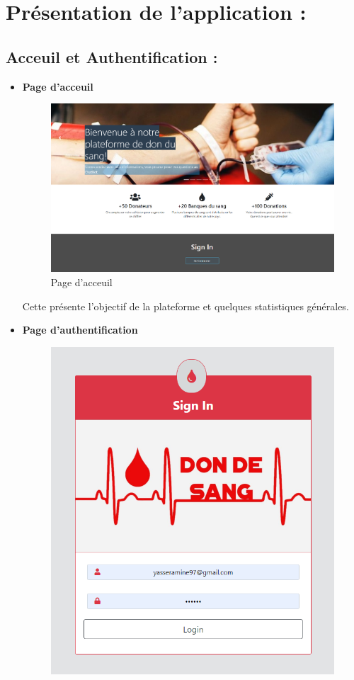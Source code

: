 \documentclass[12pt,a4paper,twoside]{report}
\begin{document}
	\section{Présentation de l'application :}{
		\subsection{Acceuil et Authentification :}{
			\begin{itemize}
					\item \textbf{Page d'acceuil}
					\begin{figure}[H]
									 \includegraphics[width=13cm]{Images/acc.png}
									 \centering
									 \caption{\label{acc} Page d'acceuil}
								\end{figure}
								Cette présente l'objectif de la plateforme et quelques statistiques générales.
					\newline
					\item \textbf{Page d'authentification}
					\begin{figure}[H]
									 \includegraphics[width=13cm]{Images/auth.png}

\end{figure}
\end{itemize}}}
\end{document}
